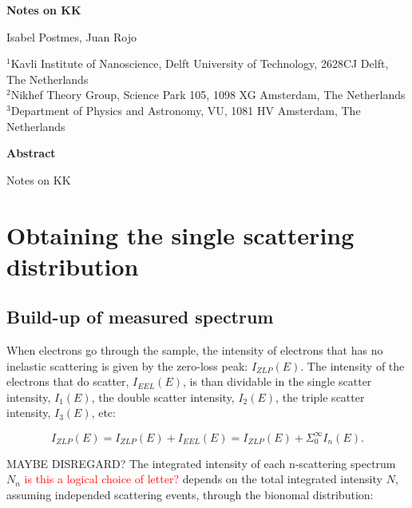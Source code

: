 \documentclass[12pt,a4paper]{article}
\numberwithin{equation}{section}
\numberwithin{figure}{section}
\numberwithin{table}{section}
\begin{document}




\begin{center}
  {\Large \bf Notes on KK}
\vspace{1.4cm}

Isabel Postmes, Juan Rojo

\vspace{1.0cm}
 
{\it \small

$^{1}$Kavli Institute of Nanoscience, Delft University of Technology, 2628CJ Delft, The
  Netherlands\\[0.1cm]
$^{2}$Nikhef Theory Group, Science Park 105, 1098 XG Amsterdam, The
  Netherlands \\[0.1cm]$^{3}$Department of Physics and Astronomy, VU,
    1081 HV Amsterdam, The Netherlands

}

\vspace{1.0cm}

{\bf \large Abstract}

\end{center}

Notes on KK


\clearpage
\tableofcontents


\section{Obtaining the single scattering distribution}

\subsection{Build-up of measured spectrum}
When electrons go through the sample, the intensity of electrons that has no inelastic scattering is given by the zero-loss peak: $I_{ZLP}(E)$. The intensity of the electrons that do scatter, $I_{EEL}(E)$, is than dividable in the single scatter intensity, $I_1(E)$, the double scatter intensity, $I_2(E)$, the triple scatter intensity, $I_3(E)$, etc:

\begin{equation}
    I_{ZLP}(E) = I_{ZLP}(E) + I_{EEL}(E) = I_{ZLP}(E) + \Sigma_0^\infty I_n(E).
\end{equation}


MAYBE DISREGARD?
The integrated intensity of each n-scattering spectrum $N_n$ \textcolor{red}{is this a logical choice of letter?} depends on the total integrated intensity $N$, assuming independed scattering events, through the bionomal distribution:
\end{document}
